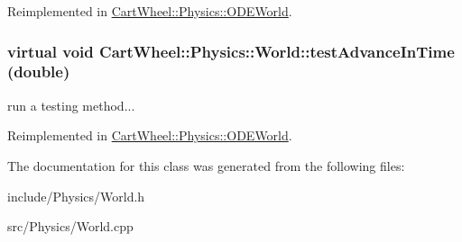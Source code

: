 Reimplemented in \hyperlink{classCartWheel_1_1Physics_1_1ODEWorld_ad5f89cdc454b093096825455db1fb294}{CartWheel::Physics::ODEWorld}.

\hypertarget{classCartWheel_1_1Physics_1_1World_a3eb9011c4c08c2183c1d9a37042e126a}{
\subsubsection[{testAdvanceInTime}]{\setlength{\rightskip}{0pt plus 5cm}virtual void CartWheel::Physics::World::testAdvanceInTime (double)}}
\label{classCartWheel_1_1Physics_1_1World_a3eb9011c4c08c2183c1d9a37042e126a}
run a testing method... 

Reimplemented in \hyperlink{classCartWheel_1_1Physics_1_1ODEWorld_a3989f16bd09d91d2ebf773567ac39e6d}{CartWheel::Physics::ODEWorld}.



The documentation for this class was generated from the following files:\begin{DoxyCompactItemize}
\item 
include/Physics/World.h\item 
src/Physics/World.cpp\end{DoxyCompactItemize}
